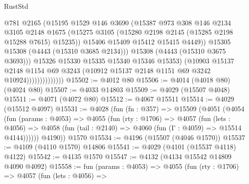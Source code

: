 \begin{lexlean}{RustStd}
\begin{coremodule}
                                  @781
                                  @2165
                                  (@15195
                                    @1529
                                    @146
                                    @3690
                                    (@15387
                                      @973
                                      @308
                                      @146
                                      @2134
                                      @3105
                                      @2148
                                      @1675
                                      (@15275
                                        @3105
                                        (@15280 @2198 @2145 (@15285 @2198 @15288 @7615) @15235))
                                      @15406
                                      @15409
                                      @15412
                                      @15415
                                      @4449))
                                  @15305
                                  @15308
                                  (@4443 (@15310 @3685 @2134)))
                                @15308
                                (@4443 (@15310 @3675 @3693)))
                              @15326
                              @15330
                              @15335
                              @15340
                              @15346
                              @15353)
                            (@10903
                              @15137
                              @2148
                              @1154
                              @69
                              @3243
                              (@10912 @15137 @2148 @1151 @69 @3242 @10924))))))))))))))
@15502 := @4012 @80
@15506 := @4014 (@4018 @80) (@4024 @80)
@15507 := @4033 @14803
@15509 := @4029 (@15507 @4048)
@15511 := @4071 (@4072 @80)
@15512 := @4067 @15511
@15514 := @4029 (@15512 @4097)
@15531 := @4028
    (fun (fn : @357) =>
    @15509
      (@4051
        (@4054
          (fun (params : @4053) =>
          @4055
            (fun (rty : @1706) =>
            @4057
              (fun (lets : @4056) =>
              @4058 (fun (tail : @2140) => @4060 (fun (Γ : @4059) => @15514 @4144))))))
        @4190))
    @1570
@15534 := @4196 (@15507 (@4046 @1570))
@15537 := @4109 (@4110 @1570) @14806
@15541 := @4029 (@4101 (@15537 @4118) @4122)
@15542 := @4135 @1570
@15547 := @4132 (@4134 @15542 @14809 @4090 @4092)
@15558 := fun (params : @4053) =>
  @4055
    (fun (rty : @1706) =>
    @4057
      (fun (lets : @4056) =>

\end{coremodule}
\end{lexlean}
